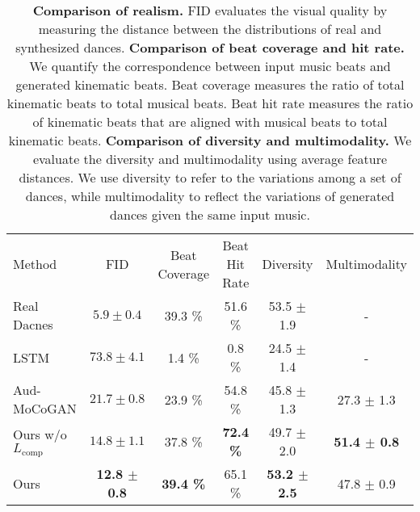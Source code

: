 \documentclass{article}
\newlength\figmargin
\begin{document}
\begin{table}
\centering
\begin{tabular}{l c  c c  c c}
        \toprule
        Method        & FID & Beat Coverage & Beat Hit Rate & Diversity & Multimodality \\
        \cmidrule(lr){2-2}\cmidrule(lr){3-4}\cmidrule(lr){5-6}
Real Dacnes   & $5.9 \pm 0.4$ &  39.3 \%       & 51.6 \%   &    53.5 $\pm$ 1.9 & -     \\
        \midrule
        LSTM         & $73.8 \pm 4.1$ & 1.4 \%        & 0.8  \%     & 24.5  $\pm$ 1.4            &  -         \\
        Aud-MoCoGAN  & $21.7 \pm 0.8$ & 23.9 \%       & 54.8 \%      & 45.8 $\pm$ 1.3             & 27.3 $\pm$ 1.3       \\
        Ours w/o $L_{\mathrm{comp}}$ & $14.8 \pm 1.1$  & 37.8 \% & \textbf{72.4 \%}  &  49.7 $\pm$ 2.0 & \textbf{51.4 $\pm$ 0.8}            \\
        Ours    & \textbf{12.8 $\pm$ 0.8}  & \textbf{39.4 \%} & 65.1 \%   & \textbf{53.2 $\pm$ 2.5}    & 47.8 $\pm$ 0.9             \\
        \bottomrule
    \end{tabular}
    \vspace{2mm}
    \caption{
    \textbf{Comparison of realism.}
    FID evaluates the visual quality by measuring the distance between the distributions of real and synthesized dances. 
    \textbf{Comparison of beat coverage and hit rate.}
    We quantify the correspondence between input music beats and  generated kinematic beats.
Beat coverage measures the ratio of total kinematic beats to total musical beats.
Beat hit rate measures the ratio of kinematic beats that are aligned with musical beats to total kinematic beats.
    \textbf{Comparison of diversity and multimodality.}
    We evaluate the diversity and multimodality using average feature distances.
We use diversity to refer to the variations among a set of dances, while multimodality to reflect the variations of generated dances given the same input music.
    }
    
\label{tab:beat}
\vspace{\figmargin}
\end{table}
\end{document}
